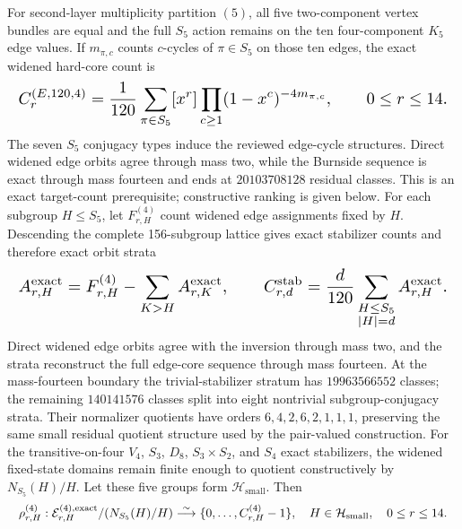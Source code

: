 \documentclass{article}
\newcommand{\fitmath}[1]{\resizebox{0.99\linewidth}{!}{$\displaystyle #1$}}
\begin{document}
For second-layer multiplicity partition $(5)$, all five two-component vertex
bundles are equal and the full $S_5$ action remains on the ten four-component
$K_5$ edge values. If $m_{\pi,c}$ counts $c$-cycles of $\pi\in S_5$ on those ten
edges, the exact widened hard-core count is
\begin{equation}
  \fitmath{%
    C_r^{(E,120,4)}=
      \frac{1}{120}\sum_{\pi\in S_5}
      [x^r]\prod_{c\geq1}(1-x^c)^{-4m_{\pi,c}},
    \qquad 0\leq r\leq14.
  }
  \label{eq:optimization-crazy-sextuple-s6-s5-edge-core}
\end{equation}
The seven $S_5$ conjugacy types induce the reviewed edge-cycle structures.
Direct widened edge orbits agree through mass two, while the Burnside sequence
is exact through mass fourteen and ends at $20103708128$ residual classes. This
is an exact target-count prerequisite; constructive ranking is given below.
For each subgroup $H\leq S_5$, let $F_{r,H}^{(4)}$ count widened edge
assignments fixed by $H$. Descending the complete 156-subgroup lattice gives
exact stabilizer counts and therefore exact orbit strata
\begin{equation}
  \fitmath{%
    A_{r,H}^{\mathrm{exact}}=
      F_{r,H}^{(4)}-\sum_{K>H}A_{r,K}^{\mathrm{exact}},
    \qquad
    C_{r,d}^{\mathrm{stab}}=
      \frac{d}{120}\sum_{\substack{H\leq S_5\\|H|=d}}
      A_{r,H}^{\mathrm{exact}}.
  }
  \label{eq:optimization-crazy-sextuple-s6-s5-stabilizer-spectrum}
\end{equation}
Direct widened edge orbits agree with the inversion through mass two, and the
strata reconstruct the full edge-core sequence through mass fourteen. At the
mass-fourteen boundary the trivial-stabilizer stratum has $19963566552$ classes;
the remaining $140141576$ classes split into eight nontrivial subgroup-conjugacy
strata. Their normalizer quotients have orders $6,4,2,6,2,1,1,1$, preserving the
same small residual quotient structure used by the pair-valued construction.
For the transitive-on-four $V_4$, $S_3$, $D_8$, $S_3\times S_2$, and $S_4$ exact
stabilizers, the widened fixed-state domains remain finite enough to quotient
constructively by $N_{S_5}(H)/H$. Let these five groups form
$\mathcal H_{\mathrm{small}}$. Then
\begin{equation}
  \fitmath{%
    \rho^{(4)}_{r,H}:
      \mathcal E_{r,H}^{(4),\mathrm{exact}}/(N_{S_5}(H)/H)
      \overset{\sim}{\longrightarrow}
      \{0,\ldots,C_{r,H}^{(4)}-1\},
    \quad H\in\mathcal H_{\mathrm{small}},\quad 0\leq r\leq14.
  }
  \label{eq:optimization-crazy-sextuple-s6-s5-small-exception-ranking}
\end{equation}
\end{document}
